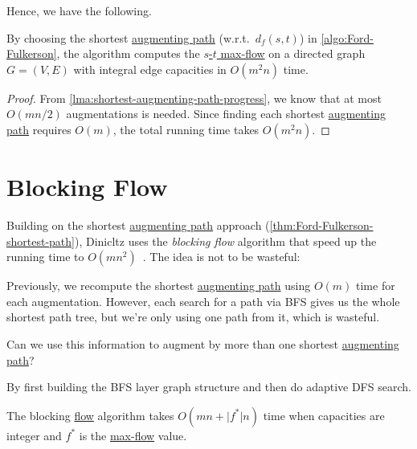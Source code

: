 Hence, we have the following.

\begin{theorem}\label{thm:Ford-Fulkerson-shortest-path}
	By choosing the shortest \hyperref[def:augmenting-path]{augmenting path} (w.r.t.\ \(d_f(s, t)\)) in \autoref{algo:Ford-Fulkerson}, the algorithm computes the \hyperref[prb:s-t-max-flow]{\(s\)-\(t\) max-flow} on a directed graph \(G = (V, E)\) with integral edge capacities in \(O(m^2 n)\) time.
\end{theorem}
\begin{proof}
	From \autoref{lma:shortest-augmenting-path-progress}, we know that at most \(O(mn / 2)\) augmentations is needed. Since finding each shortest \hyperref[def:augmenting-path]{augmenting path} requires \(O(m)\), the total running time takes \(O(m^2 n)\).
\end{proof}

\section{Blocking Flow}
Building on the shortest \hyperref[def:augmenting-path]{augmenting path} approach (\autoref{thm:Ford-Fulkerson-shortest-path}), Dinicltz uses the \emph{blocking flow} algorithm that speed up the running time to \(O(mn^2)\)~\cite{karzanov1973finding,dinic1970algorithm,goldberg1998beyond}. The idea is not to be wasteful:

\begin{intuition}
	Previously, we recompute the shortest \hyperref[def:augmenting-path]{augmenting path} using \(O(m)\) time for each augmentation. However, each search for a path via BFS gives us the whole shortest path tree, but we're only using one path from it, which is wasteful.
\end{intuition}

\begin{problem*}
	Can we use this information to augment by more than one shortest \hyperref[def:augmenting-path]{augmenting path}?
\end{problem*}
\begin{answer}
	By first building the BFS layer graph structure and then do adaptive DFS search.
\end{answer}

\begin{theorem}\label{thm:blocking-flow}
	The blocking \hyperref[def:flow]{flow} algorithm takes \(O(mn + \lvert f^{\ast} \rvert n)\) time when capacities are integer and \(f^{\ast} \) is the \hyperref[prb:s-t-max-flow]{max-flow} value.
\end{theorem}

